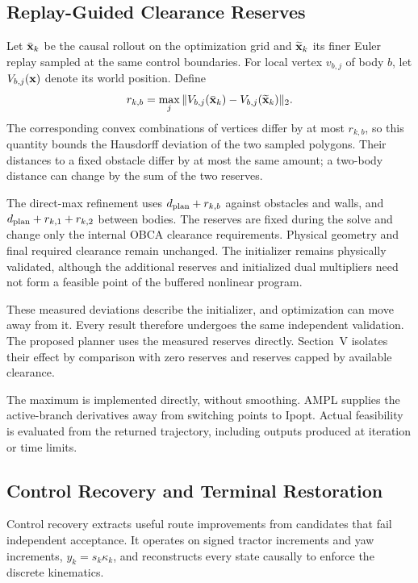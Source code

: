 \subsection{Replay-Guided Clearance Reserves}
Let $\bar{\mathbf x}_k$ be the causal rollout on the optimization grid and $\widetilde{\mathbf x}_k$ its finer Euler replay sampled at the same control boundaries. For local vertex $v_{b,j}$ of body $b$, let $V_{b,j}(\mathbf x)$ denote its world position. Define
\begin{equation}
r_{k,b}=\max_j\|V_{b,j}(\bar{\mathbf x}_k)-V_{b,j}(\widetilde{\mathbf x}_k)\|_2.
\label{eq:reserve}
\end{equation}
The corresponding convex combinations of vertices differ by at most $r_{k,b}$, so this quantity bounds the Hausdorff deviation of the two sampled polygons. Their distances to a fixed obstacle differ by at most the same amount; a two-body distance can change by the sum of the two reserves.

The direct-max refinement uses $d_{\rm plan}+r_{k,b}$ against obstacles and walls, and $d_{\rm plan}+r_{k,1}+r_{k,2}$ between bodies. The reserves are fixed during the solve and change only the internal OBCA clearance requirements. Physical geometry and final required clearance remain unchanged. The initializer remains physically validated, although the additional reserves and initialized dual multipliers need not form a feasible point of the buffered nonlinear program.

These measured deviations describe the initializer, and optimization can move away from it. Every result therefore undergoes the same independent validation. The proposed planner uses the measured reserves directly. Section~V isolates their effect by comparison with zero reserves and reserves capped by available clearance.

The maximum is implemented directly, without smoothing. AMPL supplies the active-branch derivatives away from switching points to Ipopt. Actual feasibility is evaluated from the returned trajectory, including outputs produced at iteration or time limits.

\subsection{Control Recovery and Terminal Restoration}
Control recovery extracts useful route improvements from candidates that fail independent acceptance. It operates on signed tractor increments and yaw increments, $y_k=s_k\kappa_k$, and reconstructs every state causally to enforce the discrete kinematics.

